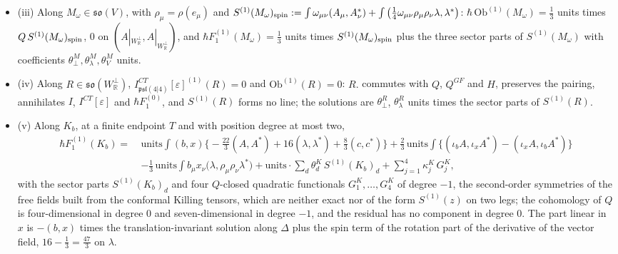 \begin{proposition}
\begin{itemize}
\[\]
the cohomology of $Q$ at this weight is one-dimensional and the residual has no component along it, and the solutions are
\[
\hbar F_1^{(1)}(\eta)=\sum_\mu x^\mu\big(L-\tfrac{79}{12}\big)\,\text{units}\cdot(T_1+T_2)(\rho(e_\mu)\eta)-\big(3L-\tfrac32\big)\,\text{units}\cdot s_0-\tfrac52\,\text{units}\cdot u_0+\theta^\eta_V\,\text{units}\cdot S^V(\eta)+\theta^\eta_\perp\,\text{units}\cdot S^\perp(\eta),
\]
with $S^V(\eta)=\sum_\mu\int x^\mu S^V_2(\rho(e_\mu)\eta)$ and $S^\perp(\eta)=\sum_\mu\int x^\mu S^\perp_2(\rho(e_\mu)\eta)+\int s_0$ (Proposition \ref{prop:c11-freexi} (iv)).
\item (iii) Along $M_\omega\in\mathfrak{so}(V)$, with $\rho_\mu=\rho(e_\mu)$ and $S^{(1)}(M_\omega)_{\rm spin}:=\int\omega_{\mu\nu}(A_\mu,A^*_\nu)+\int\big(\tfrac14\omega_{\mu\nu}\rho_\mu\rho_\nu\lambda,\lambda^*\big)$: $\hbar\,\mathrm{Ob}^{(1)}(M_\omega)=\tfrac13$ units times $Q\,S^{(1)}(M_\omega)_{\rm spin}$, $0$ on $(A|_{W_{\mathbb R}^\perp},A|_{W_{\mathbb R}^\perp})$, and $\hbar F_1^{(1)}(M_\omega)=\tfrac13$ units times $S^{(1)}(M_\omega)_{\rm spin}$ plus the three sector parts of $S^{(1)}(M_\omega)$ with coefficients $\theta^M_\perp,\theta^M_\lambda,\theta^M_V$ units.
\item (iv) Along $R\in\mathfrak{so}(W_{\mathbb R}^\perp)$, $I^{CT}_{\mathfrak{psl}(4|4)}[\varepsilon]^{(1)}(R)=0$ and $\mathrm{Ob}^{(1)}(R)=0$: $R.$ commutes with $Q$, $Q^{GF}$ and $H$, preserves the pairing, annihilates $I$, $I^{CT}[\varepsilon]$ and $\hbar F_1^{(0)}$, and $S^{(1)}(R)$ forms no line; the solutions are $\theta^R_\perp$, $\theta^R_\lambda$ units times the sector parts of $S^{(1)}(R)$.
\item (v) Along $K_b$, at a finite endpoint $T$ and with position degree at most two,
\[
\begin{aligned}
\hbar F_1^{(1)}(K_b)=\ &\text{units}\int(b,x)\Big\{-\tfrac{22}3(A,A^*)+16(\lambda,\lambda^*)+\tfrac83(c,c^*)\Big\}+\tfrac23\,\text{units}\int\big\{(\iota_bA,\iota_xA^*)-(\iota_xA,\iota_bA^*)\big\}\\
&-\tfrac13\,\text{units}\int b_\mu x_\nu\big(\lambda,\rho_\mu\rho_\nu\lambda^*\big)+\text{units}\cdot\sum_d\theta^K_d\,S^{(1)}(K_b)_d+\sum_{j=1}^4\kappa^K_j\,G^K_j,
\end{aligned}
\]
with the sector parts $S^{(1)}(K_b)_d$ and four $Q$-closed quadratic functionals $G^K_1,\dots,G^K_4$ of degree $-1$, the second-order symmetries of the free fields built from the conformal Killing tensors, which are neither exact nor of the form $S^{(1)}(z)$ on two legs; the cohomology of $Q$ is four-dimensional in degree $0$ and seven-dimensional in degree $-1$, and the residual has no component in degree $0$. The part linear in $x$ is $-(b,x)$ times the translation-invariant solution along $\Delta$ plus the spin term of the rotation part of the derivative of the vector field, $16-\tfrac13=\tfrac{47}3$ on $\lambda$.
\end{itemize}
\end{proposition}

